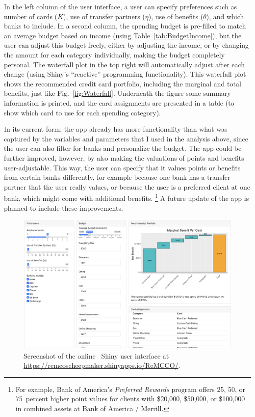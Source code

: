 In the left column of the user interface, a user can specify preferences such as number of cards ($K$), use of transfer partners ($\eta$), use of benefits ($\theta$), and which banks to include. 
In a second column, the spending budget is pre-filled to match an average budget based on income (using Table~\ref{tab:BudgetIncome}), but the user can adjust this budget freely, either by adjusting the income, or by changing the amount for each category individually, making the budget completely personal. 
The waterfall plot in the top right will automatically adjust after each change (using \textsf{Shiny's} ``reactive'' programming functionality). 
This waterfall plot shows the recommended credit card portfolio, including the marginal and total benefits, just like Fig.~\ref{fig:Waterfall}. 
Underneath the figure some summary information is printed, and the card assignments are presented in a table (to show which card to use for each spending category).

In its current form, the app already has more functionality than what was captured by the variables and parameters that I used in the analysis above, since the user can also filter for banks and personalize the budget. 
The app could be further improved, however, by also making the valuations of points and benefits user-adjustable. 
This way, the user can specify that it values points or benefits from certain banks differently, for example because one bank has a transfer partner that the user really values, or because the user is a preferred client at one bank, which might come with additional benefits.%
\footnote{For example, Bank of America's \emph{Preferred Rewards} program offers 25, 50, or 75~percent higher point values for clients with \$20,000, \$50,000, or \$100,000 in combined assets at Bank of America / Merrill.} 
A future update of the app is planned to include these improvements. 

\begin{landscape}
\begin{figure}[t!h]
    \begin{center}
    \includegraphics[scale=0.45]{../Misc/REMCCO.png}
    \caption{Screenshot of the online \sR\ \textsf{Shiny} user interface at \url{https://remcoscheepmaker.shinyapps.io/ReMCCO/}.}
    \label{fig:REMCCO}
    \end{center}
\end{figure}
\end{landscape}

